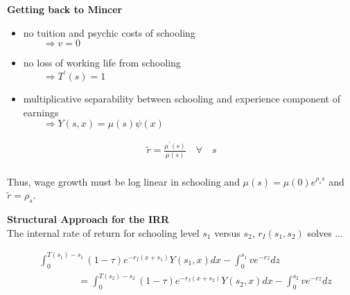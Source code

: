 \begin{frame}\textbf{Getting back to Mincer}\vspace{0.3cm}
\begin{itemize}\setlength\itemsep{1em}
\item no tuition and psychic costs of schooling \\
    $\qquad\Rightarrow v = 0$
\item no loss of working life from schooling \\
    $\qquad\Rightarrow T^\prime(s) = 1$
\item multiplicative separability between schooling and experience component of earnings \\
    $\qquad\Rightarrow Y(s, x) = \mu(s)\psi(x)$
\end{itemize}
\end{frame}
\begin{frame}
\begin{align*}
\tilde{r} = \frac{\mu^\prime(s)}{\mu(s)}\quad\forall\quad s\\
\end{align*}

Thus, wage growth must be log linear in schooling and $\mu(s) = \mu(0)e^{\rho_s s}$ and $\tilde{r} = \rho_s$.

\end{frame}
\begin{frame}\textbf{Structural Approach for the IRR}\vspace{0.3cm}\\

The internal rate of return for schooling level $s_1$ versus $s_2$, $r_I(s_1, s_2)$ solves ...

\begin{align*}
&\int_{0}^{T(s_1) - s_1} (1 - \tau)e^{-r_I(x + s_1)}Y(s_1, x) dx  - \int_{0}^{s_1} v e^{-r z} dz\\
&\qquad\qquad =  \int_{0}^{T(s_2) - s_2} (1 - \tau)e^{-r_I(x + s_2)}Y(s_2, x) dx - \int_{0}^{s_2} v e^{-r z} dz
\end{align*}

\end{frame}
